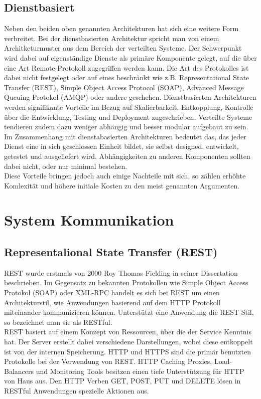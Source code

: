 	
	
	\subsection{Dienstbasiert}
	Neben den beiden oben genannten Architekturen hat sich eine weitere Form verbreitet. Bei der dienstbasierten Architektur spricht man von einem Architketurmuster aus dem Bereich der verteilten Systeme. Der Schwerpunkt wird dabei auf eigenständige Dienste als primäre Komponente gelegt, auf die über eine Art Remote-Protokoll zugegriffen werden kann. Die Art des Protokolles ist dabei nicht festgelegt oder auf eines beschränkt wie z.B. Representational State Transfer (REST), Simple Object Access Protocol (SOAP), Advanced Message Queuing Protokol (AMQP) oder andere geschehen.
	Dienstbasierten Architekturen werden signifikante Vorteile im Bezug auf Skalierbarkeit, Entkopplung, Kontrolle über die Entwicklung, Testing und Deployment zugeschrieben. Verteilte Systeme tendieren zudem dazu weniger abhängig und besser modular aufgebaut zu sein. Im Zusammenhang mit dienstabasierten Architekturen bedeutet das, das jeder Dienst eine in sich geschlossen Einheit bildet, sie selbst designed, entwickelt, getestet und ausgeliefert wird.  Abhängigkeiten zu anderen Komponenten sollten dabei nicht, oder nur minimal bestehen. \\
	Diese Vorteile bringen jedoch auch einige Nachteile mit sich, so zählen erhöhte Komlexität und höhere initiale Kosten zu den meist genannten Argumenten.

\section{System Kommunikation}
	\subsection{Representalional State Transfer (REST)}
	REST wurde erstmals von 2000 Roy Thomas Fielding in seiner Dissertation beschrieben. Im Gegensatz zu bekannten Protokollen wie Simple Object Access Protokol (SOAP) oder XML-RPC handelt es sich bei REST um einen Architekturstil, wie Anwendungen basierend auf dem HTTP Protokoll miteinander kommunizieren können. Unterstützt eine Anwendung die REST-Stil, so bezeichnet man sie als RESTful.
	\cite[vgl.][]{Melzer.2010} \\
	REST basiert auf einem Konzept von Ressourcen, über die der Service Kenntnis hat. Der Server erstellt dabei verschiedene Darstellungen, wobei diese entkoppelt ist von der internen Speicherung.
	HTTP und HTTPS sind die primär benutzten Protokolle bei der Verwendung von REST. HTTP Caching Proxies, Load-Balancers und Monitoring Tools besitzen einen tiefe Unterstützung für HTTP von Haus aus.
	Den HTTP Verben GET, POST, PUT und DELETE lösen in RESTful Anwendungen spezielle Aktionen aus.
	\\
	

